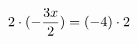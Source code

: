 \documentclass[preview]{standalone}
\begin{document}
\begin{align*}
\special{dvisvgm:raw <g id='unique000'>}2 \cdot (- \frac{3 x}{2}) = (-4) \cdot 2\special{dvisvgm:raw </g>}
\end{align*}
\end{document}
